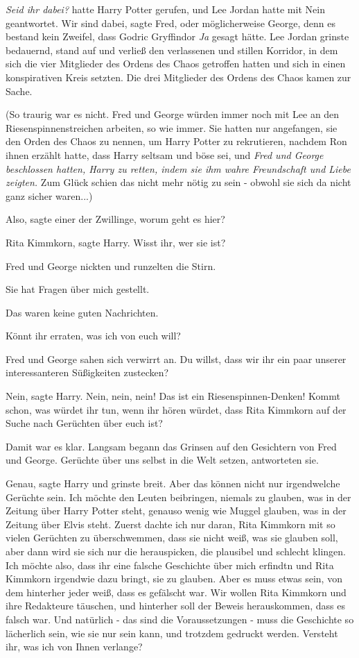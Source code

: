 \emph{Seid ihr dabei?} hatte Harry Potter gerufen, und Lee Jordan hatte mit Nein
geantwortet. \glqq Wir sind dabei\grqq{}, sagte Fred, oder möglicherweise
George, denn es bestand kein Zweifel, dass Godric Gryffindor\emph{ Ja} gesagt
hätte. Lee Jordan grinste bedauernd, stand auf und verließ den verlassenen und
stillen Korridor, in dem sich die vier Mitglieder des Ordens des Chaos getroffen
hatten und sich in einen konspirativen Kreis setzten. Die drei Mitglieder des
Ordens des Chaos kamen zur Sache.

(So traurig war es nicht. Fred und George würden immer noch mit Lee an den
Riesenspinnenstreichen arbeiten, so wie immer. Sie hatten nur angefangen, sie
den Orden des Chaos zu nennen, um Harry Potter zu rekrutieren, nachdem Ron ihnen
erzählt hatte, dass Harry seltsam und böse sei, und \emph{Fred und George
beschlossen hatten, Harry zu retten, indem sie ihm wahre Freundschaft und Liebe
zeigten.} Zum Glück schien das nicht mehr nötig zu sein - obwohl sie sich da
nicht ganz sicher waren...)

\glqq Also\grqq{}, sagte einer der Zwillinge, \glqq worum geht es hier?\grqq{}

\glqq Rita Kimmkorn\grqq{}, sagte Harry. \glqq Wisst ihr, wer sie ist?\grqq{}

Fred und George nickten und runzelten die Stirn.

\glqq Sie hat Fragen über mich gestellt.\grqq{}

Das waren keine guten Nachrichten.

\glqq Könnt ihr erraten, was ich von euch will?\grqq{}

Fred und George sahen sich verwirrt an. \glqq Du willst, dass wir ihr ein paar
unserer interessanteren Süßigkeiten zustecken?\grqq{}

\glqq Nein\grqq{}, sagte Harry. \glqq Nein, nein, nein! Das ist ein
Riesenspinnen-Denken! Kommt schon, was würdet ihr tun, wenn ihr hören würdet,
dass Rita Kimmkorn auf der Suche nach Gerüchten über euch ist?\grqq{}

Damit war es klar. Langsam begann das Grinsen auf den Gesichtern von Fred und
George. \glqq Gerüchte über uns selbst in die Welt setzen\grqq{}, antworteten
sie.

\glqq Genau\grqq{}, sagte Harry und grinste breit. \glqq Aber das können nicht
nur irgendwelche Gerüchte sein. Ich möchte den Leuten beibringen, niemals zu
glauben, was in der Zeitung über Harry Potter steht, genauso wenig wie Muggel
glauben, was in der Zeitung über Elvis steht. Zuerst dachte ich nur daran, Rita
Kimmkorn mit so vielen Gerüchten zu überschwemmen, dass sie nicht weiß, was sie
glauben soll, aber dann wird sie sich nur die herauspicken, die plausibel und
schlecht klingen. Ich möchte also, dass ihr eine falsche Geschichte über mich
erfindtn und Rita Kimmkorn irgendwie dazu bringt, sie zu glauben. Aber es muss
etwas sein, von dem hinterher jeder weiß, dass es gefälscht war. Wir wollen Rita
Kimmkorn und ihre Redakteure täuschen, und hinterher soll der Beweis
herauskommen, dass es falsch war. Und natürlich - das sind die Voraussetzungen -
muss die Geschichte so lächerlich sein, wie sie nur sein kann, und trotzdem
gedruckt werden. Versteht ihr, was ich von Ihnen verlange?\grqq{}

